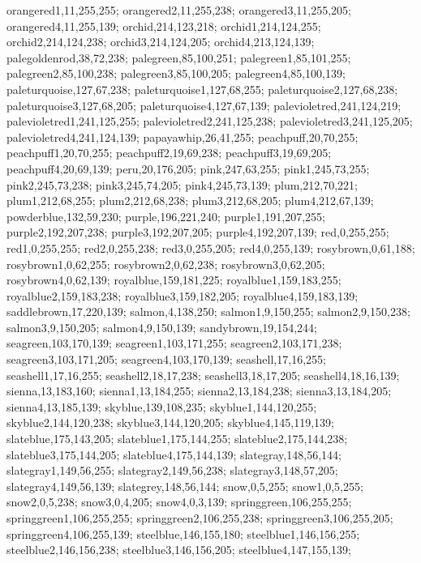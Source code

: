 {orangered1,11,255,255;%
orangered2,11,255,238;%
orangered3,11,255,205;%
orangered4,11,255,139;%
orchid,214,123,218;%
orchid1,214,124,255;%
orchid2,214,124,238;%
orchid3,214,124,205;%
orchid4,213,124,139;%
palegoldenrod,38,72,238;%
palegreen,85,100,251;%
palegreen1,85,101,255;%
palegreen2,85,100,238;%
palegreen3,85,100,205;%
palegreen4,85,100,139;%
paleturquoise,127,67,238;%
paleturquoise1,127,68,255;%
paleturquoise2,127,68,238;%
paleturquoise3,127,68,205;%
paleturquoise4,127,67,139;%
palevioletred,241,124,219;%
palevioletred1,241,125,255;%
palevioletred2,241,125,238;%
palevioletred3,241,125,205;%
palevioletred4,241,124,139;%
papayawhip,26,41,255;%
peachpuff,20,70,255;%
peachpuff1,20,70,255;%
peachpuff2,19,69,238;%
peachpuff3,19,69,205;%
peachpuff4,20,69,139;%
peru,20,176,205;%
pink,247,63,255;%
pink1,245,73,255;%
pink2,245,73,238;%
pink3,245,74,205;%
pink4,245,73,139;%
plum,212,70,221;%
plum1,212,68,255;%
plum2,212,68,238;%
plum3,212,68,205;%
plum4,212,67,139;%
powderblue,132,59,230;%
purple,196,221,240;%
purple1,191,207,255;%
purple2,192,207,238;%
purple3,192,207,205;%
purple4,192,207,139;%
red,0,255,255;%
red1,0,255,255;%
red2,0,255,238;%
red3,0,255,205;%
red4,0,255,139;%
rosybrown,0,61,188;%
rosybrown1,0,62,255;%
rosybrown2,0,62,238;%
rosybrown3,0,62,205;%
rosybrown4,0,62,139;%
royalblue,159,181,225;%
royalblue1,159,183,255;%
royalblue2,159,183,238;%
royalblue3,159,182,205;%
royalblue4,159,183,139;%
saddlebrown,17,220,139;%
salmon,4,138,250;%
salmon1,9,150,255;%
salmon2,9,150,238;%
salmon3,9,150,205;%
salmon4,9,150,139;%
sandybrown,19,154,244;%
seagreen,103,170,139;%
seagreen1,103,171,255;%
seagreen2,103,171,238;%
seagreen3,103,171,205;%
seagreen4,103,170,139;%
seashell,17,16,255;%
seashell1,17,16,255;%
seashell2,18,17,238;%
seashell3,18,17,205;%
seashell4,18,16,139;%
sienna,13,183,160;%
sienna1,13,184,255;%
sienna2,13,184,238;%
sienna3,13,184,205;%
sienna4,13,185,139;%
skyblue,139,108,235;%
skyblue1,144,120,255;%
skyblue2,144,120,238;%
skyblue3,144,120,205;%
skyblue4,145,119,139;%
slateblue,175,143,205;%
slateblue1,175,144,255;%
slateblue2,175,144,238;%
slateblue3,175,144,205;%
slateblue4,175,144,139;%
slategray,148,56,144;%
slategray1,149,56,255;%
slategray2,149,56,238;%
slategray3,148,57,205;%
slategray4,149,56,139;%
slategrey,148,56,144;%
snow,0,5,255;%
snow1,0,5,255;%
snow2,0,5,238;%
snow3,0,4,205;%
snow4,0,3,139;%
springgreen,106,255,255;%
springgreen1,106,255,255;%
springgreen2,106,255,238;%
springgreen3,106,255,205;%
springgreen4,106,255,139;%
steelblue,146,155,180;%
steelblue1,146,156,255;%
steelblue2,146,156,238;%
steelblue3,146,156,205;%
steelblue4,147,155,139;%
}
